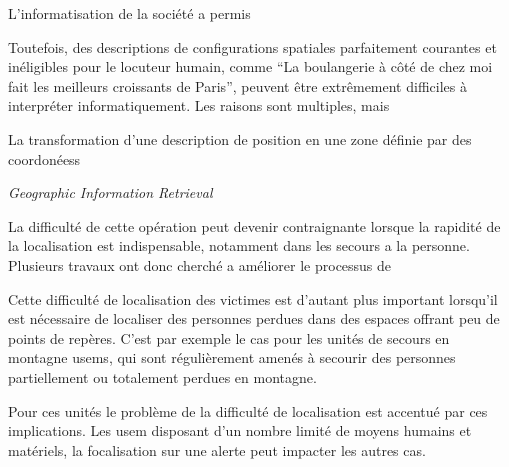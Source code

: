 
L'informatisation de la société a permis 


Toutefois, des descriptions de configurations spatiales parfaitement
courantes et inéligibles pour le locuteur humain, comme \enquote{La
  boulangerie à côté de chez moi fait les meilleurs croissants de
  Paris}, peuvent être extrêmement difficiles à interpréter
informatiquement. Les raisons sont multiples, mais 



La transformation d'une description de position en une zone définie
par des coordonéess

\emph{Geographic Information Retrieval} \autocite{Jones2008}



La difficulté de cette opération peut devenir contraignante lorsque la
rapidité de la localisation est indispensable, notamment dans les
secours a la personne. Plusieurs travaux ont donc cherché a améliorer
le processus de

\autocite{DosSantosFerreria2019} 

Cette difficulté de localisation des victimes est d'autant plus
important lorsqu'il est nécessaire de localiser des personnes perdues
dans des espaces offrant peu de points de repères. C'est par exemple
le cas pour les unités de secours en montagne \acp{usem}, qui sont
régulièrement amenés à secourir des personnes partiellement ou
totalement perdues en montagne.

Pour ces unités le problème de la difficulté de localisation est
accentué par ces implications. Les \ac{usem} disposant d'un nombre
limité de moyens humains et matériels, la focalisation sur une alerte
peut impacter les autres cas.

